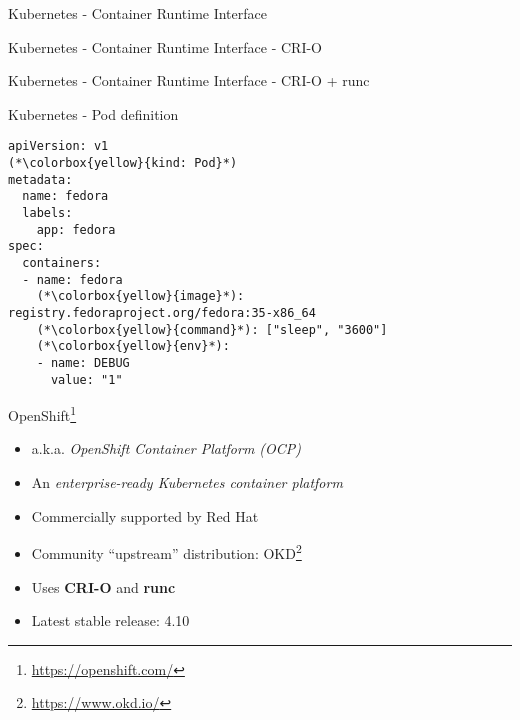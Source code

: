 \documentclass[ignorenonframetext,aspectratio=169,12pt]{beamer}
\def\svgwidth{4cm}
\begin{document}
\begin{frame}{Kubernetes - Container Runtime Interface}
\begin{center}
\def\svgwidth{\textwidth}

\end{center}
\end{frame}

\begin{frame}{Kubernetes - Container Runtime Interface - CRI-O}
\begin{center}
\def\svgwidth{\textwidth}

\end{center}
\end{frame}

\begin{frame}{Kubernetes - Container Runtime Interface - CRI-O + runc}
\begin{center}
\def\svgwidth{\textwidth}

\end{center}
\end{frame}

\begin{frame}[fragile]{Kubernetes - Pod definition}
\protect\hypertarget{kubernetes-pod-spec}{}
\begin{lstlisting}
apiVersion: v1
(*\colorbox{yellow}{kind: Pod}*)
metadata:
  name: fedora
  labels:
    app: fedora
spec:
  containers:
  - name: fedora
    (*\colorbox{yellow}{image}*): registry.fedoraproject.org/fedora:35-x86_64
    (*\colorbox{yellow}{command}*): ["sleep", "3600"]
    (*\colorbox{yellow}{env}*):
    - name: DEBUG
      value: "1"
\end{lstlisting}
\end{frame}

\begin{frame}{OpenShift\footnote{\url{https://openshift.com/}}}
\protect\hypertarget{openshift-intro}{}
\begin{itemize}
\item a.k.a. {\em OpenShift Container Platform (OCP)}
\item An {\em enterprise-ready Kubernetes container platform}
\item Commercially supported by Red Hat
\item Community ``upstream'' distribution: OKD\footnote{\url{https://www.okd.io/}}
\item Uses {\bf CRI-O} and {\bf runc}
\item Latest stable release: 4.10
\end{itemize}
\end{frame}
\end{document}
